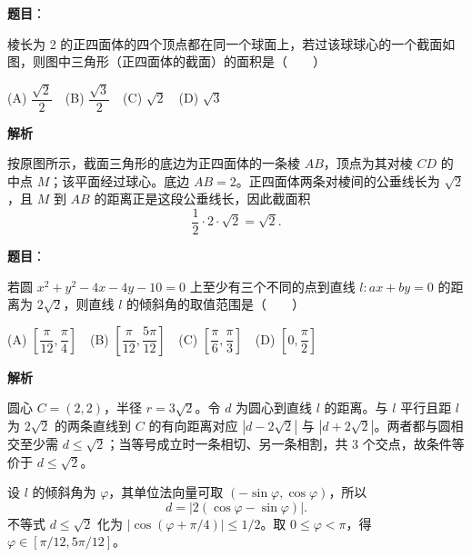 \begin{answer}

\textbf{题目}：

棱长为 2 的正四面体的四个顶点都在同一个球面上，若过该球球心的一个截面如图，则图中三角形（正四面体的截面）的面积是\mbox{（　　）}
\nopagebreak[4]
\begin{center}\end{center}
\nopagebreak[4]
(A) $\dfrac{\sqrt2}{2}$　(B) $\dfrac{\sqrt3}{2}$　(C) $\sqrt2$　(D) $\sqrt3$

\textbf{解析}

按原图所示，截面三角形的底边为正四面体的一条棱 $AB$，顶点为其对棱 $CD$ 的中点 $M$；该平面经过球心。底边 $AB=2$。正四面体两条对棱间的公垂线长为 $\sqrt2$，且 $M$ 到 $AB$ 的距离正是这段公垂线长，因此截面积
\nopagebreak[4]
\[
\frac12\cdot2\cdot\sqrt2=\sqrt2.
\]
\nopagebreak[4]
\begin{center}\end{center}
\nopagebreak[4]

\end{answer}
\begin{answer}

\textbf{题目}：

若圆 $x^2+y^2-4x-4y-10=0$ 上至少有三个不同的点到直线 $l:ax+by=0$ 的距离为 $2\sqrt2$，则直线 $l$ 的倾斜角的取值范围是\mbox{（　　）}

(A) $\left[\dfrac\pi{12},\dfrac\pi4\right]$　(B) $\left[\dfrac\pi{12},\dfrac{5\pi}{12}\right]$　(C) $\left[\dfrac\pi6,\dfrac\pi3\right]$　(D) $\left[0,\dfrac\pi2\right]$

\textbf{解析}

圆心 $C=(2,2)$，半径 $r=3\sqrt2$。令 $d$ 为圆心到直线 $l$ 的距离。与 $l$ 平行且距 $l$ 为 $2\sqrt2$ 的两条直线到 $C$ 的有向距离对应 $|d-2\sqrt2|$ 与 $|d+2\sqrt2|$。两者都与圆相交至少需 $d\le\sqrt2$；当等号成立时一条相切、另一条相割，共 3 个交点，故条件等价于 $d\le\sqrt2$。

设 $l$ 的倾斜角为 $\varphi$，其单位法向量可取 $(-\sin\varphi,\cos\varphi)$，所以
\nopagebreak[4]
\[
d=|2(\cos\varphi-\sin\varphi)|.
\]
不等式 $d\le\sqrt2$ 化为 $|\cos(\varphi+\pi/4)|\le1/2$。取 $0\le\varphi<\pi$，得 $\varphi\in[\pi/12,5\pi/12]$。


\end{answer}

